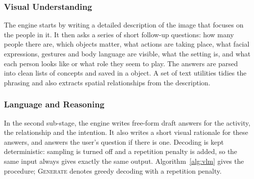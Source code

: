 \subsubsection{Visual Understanding}
The engine starts by writing a detailed description of the image that focuses on the people in it. It then asks a series of short follow-up questions: how many people there are, which objects matter, what actions are taking place, what facial expressions, gestures and body language are visible, what the setting is, and what each person looks like or what role they seem to play. The answers are parsed into clean lists of concepts and saved in a  object. A set of text utilities tidies the phrasing and also extracts spatial relationships from the description.

\subsubsection{Language and Reasoning}
In the second sub-stage, the engine writes free-form draft answers for the activity, the relationship and the intention. It also writes a short visual rationale for these answers, and answers the user's question if there is one. Decoding is kept deterministic: sampling is turned off and a repetition penalty is added, so the same input always gives exactly the same output. Algorithm~\ref{alg:vlm} gives the procedure; \textsc{Generate} denotes greedy decoding with a repetition penalty.

